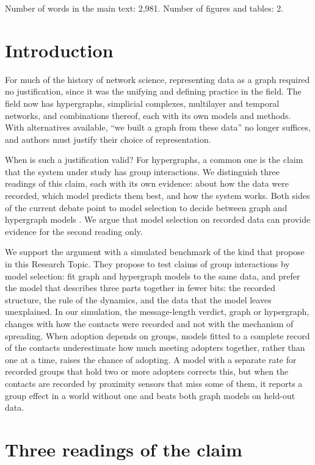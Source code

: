 \documentclass[utf8]{FrontiersinHarvard}
\begin{document}
\noindent Number of words in the main text: 2,981. Number of figures and tables: 2.

\section{Introduction}\label{sec-intro}

For much of the history of network science, representing data as a graph required no justification, since it was the unifying and defining practice in the field. The field now has hypergraphs, simplicial complexes, multilayer and temporal networks, and combinations thereof, each with its own models and methods. With alternatives available, ``we built a graph from these data'' no longer suffices, and authors must justify their choice of representation.

When is such a justification valid? For hypergraphs, a common one is the claim that the system under study has group interactions. We distinguish three readings of this claim, each with its own evidence: about how the data were recorded, which model predicts them best, and how the system works. Both sides of the current debate point to model selection to decide between graph and hypergraph models \citep{peixoto2026,arenas2026}. We argue that model selection on recorded data can provide evidence for the second reading only.

We support the argument with a simulated benchmark of the kind that \citet{rommens2026} propose in this Research Topic. They propose to test claims of group interactions by model selection: fit graph and hypergraph models to the same data, and prefer the model that describes three parts together in fewer bits: the recorded structure, the rule of the dynamics, and the data that the model leaves unexplained. In our simulation, the message-length verdict, graph or hypergraph, changes with how the contacts were recorded and not with the mechanism of spreading. When adoption depends on groups, models fitted to a complete record of the contacts underestimate how much meeting adopters together, rather than one at a time, raises the chance of adopting. A model with a separate rate for recorded groups that hold two or more adopters corrects this, but when the contacts are recorded by proximity sensors that miss some of them, it reports a group effect in a world without one and beats both graph models on held-out data.

\section{Three readings of the claim}\label{sec-argument}
\end{document}
